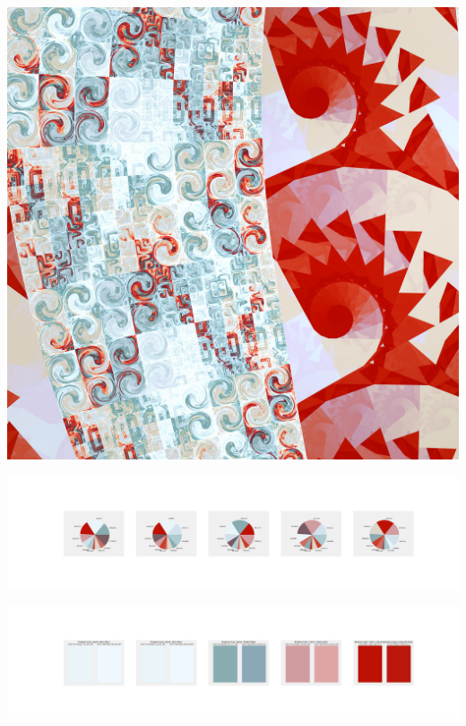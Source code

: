 \documentclass[11pt]{article}
\begin{document}
\begin{landscape}
    \begin{center}
    \includegraphics[width=\textwidth]{./nbimg/file (376).jpg}
    \end{center}

    \begin{center}
    \includegraphics[width=250mm]{./nbimg/pie-307.jpg}
    \end{center}

    \begin{center}
    \includegraphics[width=250mm]{./nbimg/peak-307.jpg}
    \end{center}
    


\end{landscape}
\end{document}
